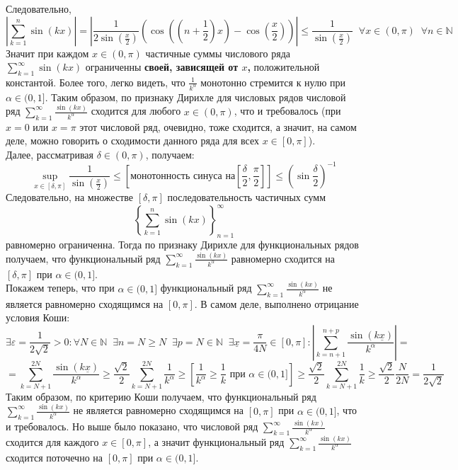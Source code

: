 \documentclass[11pt]{article}
\begin{document}
\begin{enumerate}
    Следовательно,
    \[\left\lvert \sum_{k = 1}^n \sin (kx) \right\rvert = \left\lvert \frac{1}{2 \sin \left(\displaystyle \frac{x}{2}\right)} \left( \cos \left( \left( n + \frac{1}{2} \right) x \right) - \cos \left(\frac{x}{2} \right) \right) \right\rvert \leq \frac{1}{\displaystyle \sin \left(\frac{x}{2}\right)} \; \; \forall x \in (0, \pi) \; \; \forall n \in \mathbb{N}\]
    Значит при каждом $x \in (0, \pi)$ частичные суммы числового ряда $\displaystyle \sum_{k = 1}^{\infty} \sin (kx)$ ограниченны \textbf{своей, зависящей от $x$,} положительной константой. Более того, легко видеть, что $\displaystyle \frac{1}{k^{\alpha}}$ монотонно стремится к нулю при $\alpha \in (0, 1]$. Таким образом, по признаку Дирихле для числовых рядов числовой ряд $\displaystyle \sum_{k = 1}^{\infty} \frac{\sin (kx)}{k^{\alpha}}$ сходится для любого $x \in (0, \pi)$, что и требовалось (при $x = 0$ или $x = \pi$ этот числовой ряд, очевидно, тоже сходится, а значит, на самом деле, можно говорить о сходимости данного ряда для всех $x \in [0, \pi]$). \\
    Далее, рассматривая $\delta \in (0, \pi)$, получаем:
    \[\sup_{x \in [\delta, \pi]} \frac{1}{\sin \left(\displaystyle \frac{x}{2} \right)} \leq \left[\text{монотонность синуса на} \left[\frac{\delta}{2}, \frac{\pi}{2}\right]\right] \leq \left(\sin \frac{\delta}{2} \right)^{-1}\]
    Следовательно, на множестве $[\delta, \pi]$ последовательность частичных сумм 
    \[\left\{\sum_{k = 1}^n \sin (kx) \right\}_{n = 1}^{\infty}\]
    равномерно ограниченна. Тогда по признаку Дирихле для функциональных рядов получаем, что функциональный ряд $\displaystyle \sum_{k = 1}^{\infty} \frac{\sin (kx)}{k^{\alpha}}$ равномерно сходится на $[\delta, \pi]$ при $\alpha \in (0, 1]$. \\
    Покажем теперь, что при $\alpha \in (0, 1]$ функциональный ряд $\displaystyle \sum_{k = 1}^{\infty} \frac{\sin (kx)}{k^{\alpha}}$ не является равномерно сходящимся на $[0, \pi]$. В самом деле, выполнено отрицание условия Коши:
    \[\exists \varepsilon = \frac{1}{2 \sqrt{2}} > 0: \forall N \in \mathbb{N} \; \; \exists n = N \geq N \; \; \exists p = N \in \mathbb{N} \; \; \exists \underline{x} = \frac{\pi}{4N} \in [0, \pi]: \left\lvert \sum_{k = n + 1}^{n + p} \frac{\sin (k \underline{x})}{k^{\alpha}} \right\rvert =\]
    \[= \sum_{k = N + 1}^{2N} \frac{\sin (k \underline{x})}{k^{\alpha}} \geq \frac{\sqrt{2}}{2} \sum_{k = N + 1}^{2N} \frac{1}{k^{\alpha}} \geq \left[\frac{1}{k^{\alpha}} \geq \frac{1}{k} \text{ при } \alpha \in (0, 1] \right] \geq \frac{\sqrt{2}}{2} \sum_{k = N + 1}^{2N} \frac{1}{k} \geq \frac{\sqrt{2}}{2} \frac{N}{2N} = \frac{1}{2 \sqrt{2}}\]
    Таким образом, по критерию Коши получаем, что функциональный ряд $\displaystyle \sum_{k = 1}^{\infty} \frac{\sin (kx)}{k^{\alpha}}$ не является равномерно сходящимся на $[0, \pi]$ при $\alpha \in (0, 1]$, что и требовалось. Но выше было показано, что числовой ряд $\displaystyle \sum_{k = 1}^{\infty} \frac{\sin (kx)}{k^{\alpha}}$ сходится для каждого $x \in [0, \pi]$, а значит функциональный ряд $\displaystyle \sum_{k = 1}^{\infty} \frac{\sin (kx)}{k^{\alpha}}$ сходится поточечно на $[0, \pi]$ при $\alpha \in (0, 1]$.
\end{enumerate}
\end{document}
